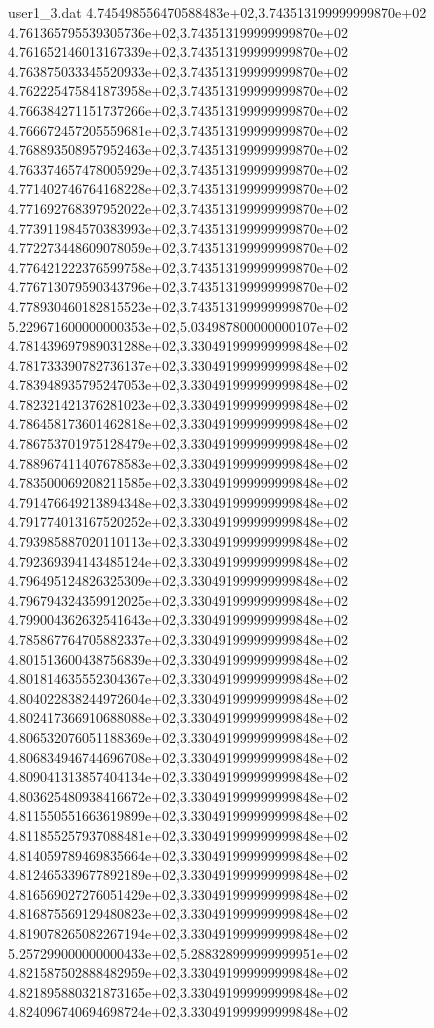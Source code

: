 \begin{filecontents}{user1_3.dat}
4.745498556470588483e+02,3.743513199999999870e+02
4.761365795539305736e+02,3.743513199999999870e+02
4.761652146013167339e+02,3.743513199999999870e+02
4.763875033345520933e+02,3.743513199999999870e+02
4.762225475841873958e+02,3.743513199999999870e+02
4.766384271151737266e+02,3.743513199999999870e+02
4.766672457205559681e+02,3.743513199999999870e+02
4.768893508957952463e+02,3.743513199999999870e+02
4.763374657478005929e+02,3.743513199999999870e+02
4.771402746764168228e+02,3.743513199999999870e+02
4.771692768397952022e+02,3.743513199999999870e+02
4.773911984570383993e+02,3.743513199999999870e+02
4.772273448609078059e+02,3.743513199999999870e+02
4.776421222376599758e+02,3.743513199999999870e+02
4.776713079590343796e+02,3.743513199999999870e+02
4.778930460182815523e+02,3.743513199999999870e+02
5.229671600000000353e+02,5.034987800000000107e+02
4.781439697989031288e+02,3.330491999999999848e+02
4.781733390782736137e+02,3.330491999999999848e+02
4.783948935795247053e+02,3.330491999999999848e+02
4.782321421376281023e+02,3.330491999999999848e+02
4.786458173601462818e+02,3.330491999999999848e+02
4.786753701975128479e+02,3.330491999999999848e+02
4.788967411407678583e+02,3.330491999999999848e+02
4.783500069208211585e+02,3.330491999999999848e+02
4.791476649213894348e+02,3.330491999999999848e+02
4.791774013167520252e+02,3.330491999999999848e+02
4.793985887020110113e+02,3.330491999999999848e+02
4.792369394143485124e+02,3.330491999999999848e+02
4.796495124826325309e+02,3.330491999999999848e+02
4.796794324359912025e+02,3.330491999999999848e+02
4.799004362632541643e+02,3.330491999999999848e+02
4.785867764705882337e+02,3.330491999999999848e+02
4.801513600438756839e+02,3.330491999999999848e+02
4.801814635552304367e+02,3.330491999999999848e+02
4.804022838244972604e+02,3.330491999999999848e+02
4.802417366910688088e+02,3.330491999999999848e+02
4.806532076051188369e+02,3.330491999999999848e+02
4.806834946744696708e+02,3.330491999999999848e+02
4.809041313857404134e+02,3.330491999999999848e+02
4.803625480938416672e+02,3.330491999999999848e+02
4.811550551663619899e+02,3.330491999999999848e+02
4.811855257937088481e+02,3.330491999999999848e+02
4.814059789469835664e+02,3.330491999999999848e+02
4.812465339677892189e+02,3.330491999999999848e+02
4.816569027276051429e+02,3.330491999999999848e+02
4.816875569129480823e+02,3.330491999999999848e+02
4.819078265082267194e+02,3.330491999999999848e+02
5.257299000000000433e+02,5.288328999999999951e+02
4.821587502888482959e+02,3.330491999999999848e+02
4.821895880321873165e+02,3.330491999999999848e+02
4.824096740694698724e+02,3.330491999999999848e+02

\end{filecontents}
